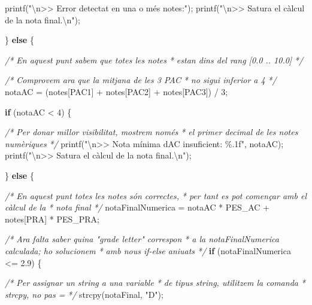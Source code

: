 \documentclass[]{book}
\newenvironment{Shaded}{\begin{snugshade}}{\end{snugshade}}
\newcommand{\CommentTok}[1]{\textcolor[rgb]{0.56,0.35,0.01}{\textit{#1}}}
\newcommand{\ControlFlowTok}[1]{\textcolor[rgb]{0.13,0.29,0.53}{\textbf{#1}}}
\newcommand{\DecValTok}[1]{\textcolor[rgb]{0.00,0.00,0.81}{#1}}
\newcommand{\FloatTok}[1]{\textcolor[rgb]{0.00,0.00,0.81}{#1}}
\newcommand{\NormalTok}[1]{#1}
\newcommand{\SpecialCharTok}[1]{\textcolor[rgb]{0.00,0.00,0.00}{#1}}
\newcommand{\StringTok}[1]{\textcolor[rgb]{0.31,0.60,0.02}{#1}}
\begin{document}
\begin{Shaded}
\begin{Highlighting}[]
\NormalTok{        printf(}\StringTok{"}\SpecialCharTok{\textbackslash{}n}\StringTok{\textgreater{}\textgreater{} Error detectat en una o més notes:"}\NormalTok{);}
\NormalTok{        printf(}\StringTok{"}\SpecialCharTok{\textbackslash{}n}\StringTok{\textgreater{}\textgreater{} S\textquotesingle{}atura el càlcul de la nota final.}\SpecialCharTok{\textbackslash{}n}\StringTok{"}\NormalTok{);}

\NormalTok{    \} }\ControlFlowTok{else}\NormalTok{ \{}

        \CommentTok{/* En aquest punt sabem que totes les notes}
\CommentTok{         * estan dins del rang [0.0 .. 10.0]}
\CommentTok{         */}

        \CommentTok{/* Comprovem ara que la mitjana de les 3 PAC }
\CommentTok{         * no sigui inferior a 4}
\CommentTok{         */}
\NormalTok{        notaAC = (notes[PAC1] + notes[PAC2] + notes[PAC3]) / }\DecValTok{3}\NormalTok{;}

        \ControlFlowTok{if}\NormalTok{ (notaAC \textless{} }\DecValTok{4}\NormalTok{) \{}

           \CommentTok{/* Per donar millor visibilitat, mostrem només}
\CommentTok{            * el primer decimal de les notes numèriques}
\CommentTok{            */}
\NormalTok{           printf(}\StringTok{"}\SpecialCharTok{\textbackslash{}n}\StringTok{\textgreater{}\textgreater{} Nota mínima d\textquotesingle{}AC insuficient: \%.1f"}\NormalTok{, notaAC);}
\NormalTok{           printf(}\StringTok{"}\SpecialCharTok{\textbackslash{}n}\StringTok{\textgreater{}\textgreater{} S\textquotesingle{}atura el càlcul de la nota final.}\SpecialCharTok{\textbackslash{}n}\StringTok{"}\NormalTok{);}

\NormalTok{        \} }\ControlFlowTok{else}\NormalTok{ \{}

            \CommentTok{/* En aquest punt totes les notes són correctes,}
\CommentTok{             * per tant es pot començar amb el càlcul de la }
\CommentTok{             * nota final}
\CommentTok{             */}
\NormalTok{            notaFinalNumerica = notaAC * PES\_AC + notes[PRA] * PES\_PRA;}

            \CommentTok{/* Ara falta saber quina "grade letter" correspon}
\CommentTok{             * a la notaFinalNumerica calculada; ho solucionem}
\CommentTok{             * amb nous if{-}else aniuats}
\CommentTok{             */}
            \ControlFlowTok{if}\NormalTok{ (notaFinalNumerica \textless{}= }\FloatTok{2.9}\NormalTok{) \{}

                \CommentTok{/* Per assignar un string a una variable}
\CommentTok{                 * de tipus string, utilitzem la comanda}
\CommentTok{                 * strcpy, no pas \textquotesingle{}=\textquotesingle{}}
\CommentTok{                 */}
\NormalTok{                strcpy(notaFinal, }\StringTok{"D"}\NormalTok{);}


\end{Highlighting}
\end{Shaded}
\end{document}
